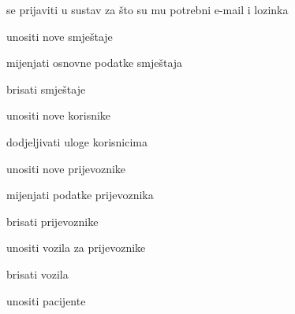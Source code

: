 	
	\begin{packed_enum}
		\item  {}
		
		\begin{packed_enum}
			
			\item se prijaviti u sustav za što su mu potrebni e-mail i lozinka
			
		\end{packed_enum}
		
		\item  {}
		
		\begin{packed_enum}
			
			\item unositi nove smještaje
			\item mijenjati osnovne podatke smještaja
			\item brisati smještaje
			\item unositi nove korisnike
			\item dodjeljivati uloge korisnicima
			
		\end{packed_enum}
		
		\item  {}
		
		\begin{packed_enum}
			
			\item unositi nove prijevoznike
			\item mijenjati podatke prijevoznika
			\item brisati prijevoznike
			\item unositi vozila za prijevoznike
			\item brisati vozila
			
		\end{packed_enum}
		
		\item  {}
		
		\begin{packed_enum}
			
			\item unositi pacijente
			
		\end{packed_enum}
		
		\item  {}
		

\end{packed_enum}
